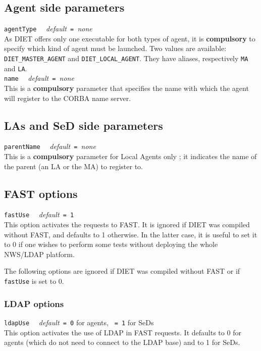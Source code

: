 \subsection{Agent side parameters}

\noindent
\texttt{agentType} \ \ \emph{default}\texttt{ = }\emph{none}\\
As DIET offers only one executable for both types of agent, it is
\textbf{compulsory} to specify which kind of agent must be launched. Two values
are available: \texttt{DIET\_MASTER\_AGENT} and \texttt{DIET\_LOCAL\_AGENT}.
They have aliases, respectively \texttt{MA} and \texttt{LA}.
\\

\noindent
\texttt{name} \ \ \emph{default}\texttt{ = }\emph{none}\\
This is a \textbf{compulsory} parameter that specifies the name with
which the agent will register to the CORBA name server.


\subsection{LAs and SeD side parameters}

\noindent
\texttt{parentName} \ \ \emph{default}\texttt{ = }\emph{none}\\
This is a \textbf{compulsory} parameter for Local Agents only ; it indicates the
name of the parent (an LA or the MA) to register to.


\subsection{FAST options}

\noindent
\texttt{fastUse} \ \ \emph{default}\texttt{ = 1}\\
This option activates the requests to FAST. It is ignored if DIET was
compiled without FAST, and defaults to 1 otherwise. In the latter case, it is
useful to set it to 0 if one wishes to perform some tests
without deploying the whole NWS/LDAP platform.

The following options are ignored if DIET was compiled without FAST or if
\texttt{fastUse} is set to 0.

\subsubsection{LDAP options}

\noindent
\texttt{ldapUse} \ \ \emph{default}\texttt{ = 0} for agents, \texttt{ = 1} for
SeDs\\
This option activates the use of LDAP in FAST requests. It defaults to 0 for
agents (which do not need to connect to the LDAP base) and to 1 for SeDs.
\\

